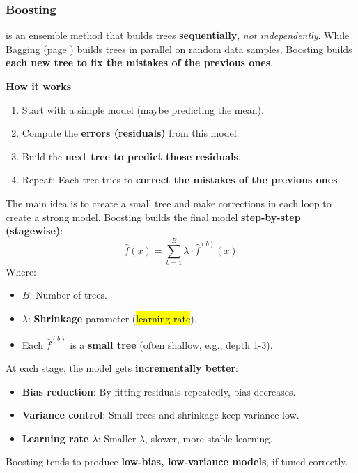 \subsubsection{Boosting}

 is an ensemble method that builds trees \textbf{sequentially}, \emph{not independently}. While Bagging (page \pageref{subsubsection: Bagging}) builds trees in parallel on random data samples, Boosting builds \textbf{each new tree to fix the mistakes of the previous ones}.

\highspace
\begin{flushleft}
    \textcolor{Green3}{ \textbf{How it works}}
\end{flushleft}
\begin{enumerate}
    \item Start with a simple model (maybe predicting the mean).
    \item Compute the \textbf{errors (residuals)} from this model.
    \item Build the \textbf{next tree to predict those residuals}.
    \item Repeat: Each tree tries to \textbf{correct the mistakes of the previous ones}
\end{enumerate}
The main idea is to create a small tree and make corrections in each loop to create a strong model. Boosting builds the final model \textbf{step-by-step (stagewise)}:
\begin{equation}
    \hat{f}(x) = \sum_{b=1}^B \lambda \cdot \hat{f}^{(b)}(x)
\end{equation}
Where:
\begin{itemize}
    \item $B$: Number of trees.
    \item $\lambda$: \textbf{Shrinkage} parameter (\hl{learning rate}).
    \item Each $\hat{f}^{(b)}$ is a \textbf{small tree} (often shallow, e.g., depth 1-3).
\end{itemize}
At each stage, the model gets \textbf{incrementally better}:
\begin{itemize}[label=\textcolor{Green3}{}]
    \item \textcolor{Green3}{\textbf{Bias reduction}}: By fitting residuals repeatedly, bias decreases.
    \item \textcolor{Green3}{\textbf{Variance control}}: Small trees and shrinkage keep variance low.
    \item \textcolor{Green3}{\textbf{Learning rate $\lambda$}}: Smaller $\lambda$, slower, more stable learning.
\end{itemize}
Boosting tends to produce \textbf{low-bias, low-variance models}, if tuned correctly.

